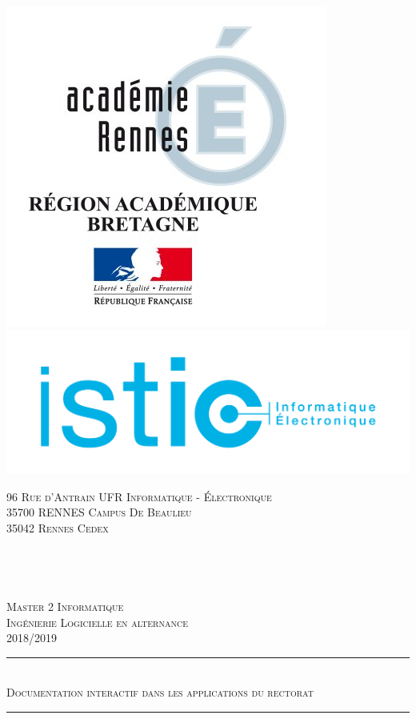 \documentclass[12pt]{article}
\begin{document}
\begin{titlepage}
	
    \vspace*{0.0 cm}
    \begin{flushleft}
    
    \includegraphics  [scale = 0.6] {diagrammes/logo_Rectorat.jpg}\includegraphics  [scale = 0.1] {diagrammes/lo.png}
    \end{flushleft}
    \textsc{96 Rue d'Antrain}\hspace{100 pt}\textsc{ UFR Informatique - Électronique }\\
    \hspace{20 pt}\textsc{35700 RENNES }\hspace{200 pt}\textsc{Campus De Beaulieu}\\
    \hspace{289 pt}\textsc{35042 Rennes Cedex}\\
   \\
   \\
   \\
   \\
 	\centering   %
	\textsc{\large Master 2 Informatique}\\
		\textsc{\large Ingénierie Logicielle en alternance}\\
		\textsc{\large 2018/2019}\\
	\rule{\linewidth}{0.7 mm} \\[0.2 cm]
	\textsc{\large Documentation interactif dans les applications du rectorat}\\
	\rule{\linewidth}{0.2 mm} \\[0.2 cm]


\end{titlepage}
\end{document}
